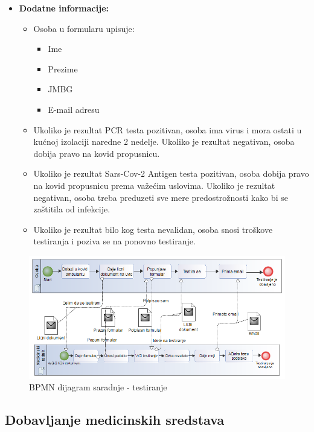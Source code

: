\documentclass[titlepage]{article}
\begin{document}
\begin{itemize}
\begin{itemize}
        \end{itemize}
    \item \textbf{Dodatne informacije:}
        \begin{itemize}
            \item Osoba u formularu upisuje:
            \begin{itemize}
                \item Ime
                \item Prezime
                \item JMBG
                \item E-mail adresu
            \end{itemize}
            \item Ukoliko je rezultat PCR testa pozitivan, osoba ima virus i mora ostati u kućnoj izolaciji naredne 2 nedelje. Ukoliko je rezultat negativan, osoba dobija pravo na kovid propusnicu.
            \item Ukoliko je rezultat Sars-Cov-2 Antigen testa pozitivan, osoba dobija pravo na kovid propusnicu prema važećim uslovima. Ukoliko je rezultat negativan, osoba treba preduzeti sve mere predostrožnosti kako bi se zaštitila od infekcije.
            \item Ukoliko je rezultat bilo kog testa nevalidan, osoba snosi troškove testiranja i poziva se na ponovno testiranje.
        \end{itemize}
\end{itemize}

\begin{figure}[H]
\centering
\includegraphics[scale=0.5]{Dijagram_testiranje}
\caption{BPMN dijagram saradnje - testiranje}
\end{figure}

\subsection{Dobavljanje medicinskih sredstava}
\end{document}
